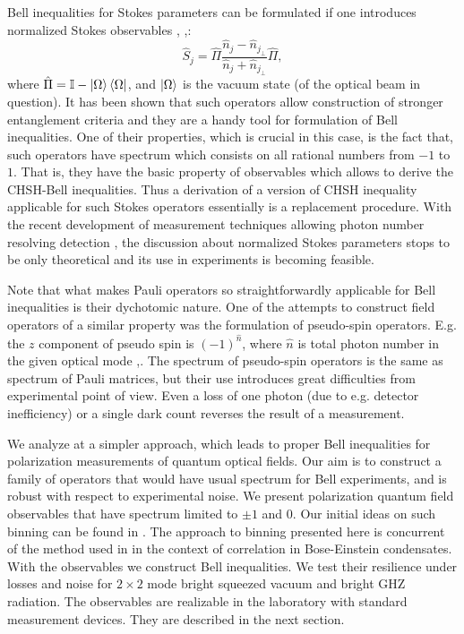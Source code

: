 \documentclass[aps,pra, twocolumn, showpacs]{revtex4-2}
\begin{document}
Bell inequalities for Stokes parameters can be formulated if one introduces normalized Stokes observables
\cite{Stokes:original}, \cite{ZUKUPRA},\cite{ZUKUBELL}: \begin{equation}
 \hat S_{j}  =  \hat \Pi \frac{\hat n_{j} - \hat n_{{j}_\perp}}{\hat n_{j} + \hat n_{{j}_\perp}} \hat \Pi,
\label{STOKES0}
\end{equation}
where $\hat \Pi=\mathbb{I}-\ket{\Omega}\bra{\Omega}$, and 
$\ket{\Omega}$ is the vacuum state (of the optical beam in question). %
It has been shown that such operators allow construction of stronger entanglement criteria and they are a handy tool for formulation of Bell inequalities. One of their properties, which is crucial in this case, is the fact that, such operators have spectrum which consists on all rational numbers from $-1$ to $1$. That is, they have the basic property of observables which allows to derive the CHSH-Bell inequalities. Thus a derivation of a version of CHSH inequality applicable for such Stokes operators essentially is a replacement procedure. With the  recent development  of  measurement techniques allowing photon number resolving detection \cite{WALMSLEY},\cite{WEAKHOMO-OPTICAL-COHERENCE} the discussion about normalized Stokes parameters stops to be only theoretical and its use in experiments is becoming feasible.




Note that what makes Pauli operators so straightforwardly applicable  for Bell inequalities is their dychotomic nature.  One of the attempts to construct  field operators of a similar property was the  formulation of pseudo-spin operators. E.g. the $z$ component of pseudo spin is $(-1)^{\hat n}$, where $\hat n$ is total photon number in the given optical mode \cite{Pspin1},\cite{Pspin2}.
The spectrum of  pseudo-spin operators is the same as spectrum of Pauli matrices, but their use introduces great difficulties from experimental point of view.
Even a loss of one photon (due to e.g. detector inefficiency) or  a single dark count reverses the result of a  measurement. 

We analyze at a simpler approach, which  leads to proper Bell inequalities for polarization measurements of quantum optical  fields.
Our aim is  to construct a family of operators that would have usual spectrum for Bell experiments,  and  is robust with respect to experimental noise. 
We present polarization quantum field observables that have spectrum limited to $\pm1$ and $0$. Our initial ideas on such binning can be found in \cite{Thesis}. The approach to binning presented here is concurrent of the method used in \cite{PhysRevA.104.043323} in the context of correlation in Bose-Einstein condensates.
With  the observables we construct Bell inequalities. We test their resilience under losses and noise for $2 \times 2$ mode bright squeezed vacuum and bright GHZ radiation. 
The  observables are realizable in the laboratory with  standard measurement devices. They are described in the next section.
\end{document}
